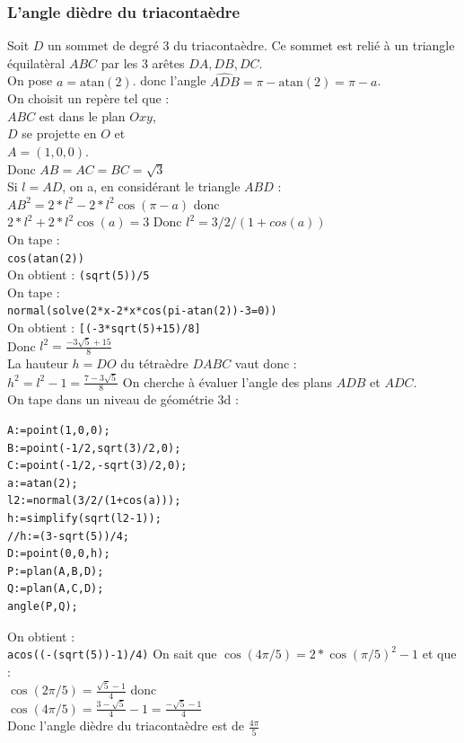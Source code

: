 \documentclass[a4paper,11pt]{book}
\newcommand{\atan}{\mbox{atan}}
\begin{document}
\subsubsection{L'angle di\`edre du triaconta\`edre}
Soit $D$ un sommet de degr\'e 3 du triaconta\`edre. Ce sommet est reli\'e \`a 
un triangle \'equilat\`eral $ABC$ par les 3 ar\^etes $DA,DB,DC$.\\
On pose $a=\atan(2)$. donc 
l'angle $\widehat{ADB}=\pi-\atan(2)=\pi-a$.\\
On choisit un rep\`ere tel que :\\
$ABC$ est dans le plan $Oxy$,\\
$D$ se projette en $O$ et \\
$A=(1,0,0)$.\\
Donc $AB=AC=BC=\sqrt 3$\\
Si $l=AD$, on a, en consid\'erant le triangle $ABD$ :\\
$AB^2=2*l^2-2*l^2\cos(\pi-a)$ donc\\
$2*l^2+2*l^2\cos(a)=3$ 
Donc $l^2=3/2/(1+cos(a))$\\
On tape :\\
{\tt cos(atan(2))}\\
On obtient : {\tt (sqrt(5))/5}\\
On tape :\\
{\tt normal(solve(2*x-2*x*cos(pi-atan(2))-3=0))}\\
On obtient : {\tt [(-3*sqrt(5)+15)/8]}\\
Donc $l^2=\frac{-3\sqrt 5+15}{8}$\\
La hauteur $h=DO$ du t\'etra\`edre $DABC$ vaut donc :\\
$h^2=l^2-1=\frac{7-3\sqrt 5}{8}$
On cherche \`a \'evaluer l'angle des plans $ADB$ et $ADC$.\\
On tape dans un niveau de g\'eom\'etrie 3d :
\begin{verbatim}
A:=point(1,0,0);
B:=point(-1/2,sqrt(3)/2,0);
C:=point(-1/2,-sqrt(3)/2,0);
a:=atan(2);
l2:=normal(3/2/(1+cos(a)));
h:=simplify(sqrt(l2-1));
//h:=(3-sqrt(5))/4;
D:=point(0,0,h);
P:=plan(A,B,D);
Q:=plan(A,C,D);
angle(P,Q);
\end{verbatim}
On obtient :\\
{\tt acos((-(sqrt(5))-1)/4)}
On sait que $\cos(4\pi/5)=2*\cos(\pi/5)^2-1$ et que :\\
$\cos(2\pi/5)=\frac{\sqrt 5-1}{4}$ donc\\
$\cos(4\pi/5)= \frac{3-\sqrt 5}{4}-1=\frac{-\sqrt 5-1}{4}$\\
Donc l'angle di\`edre du triaconta\`edre est de $\displaystyle \frac{4\pi}{5}$
\end{document}
